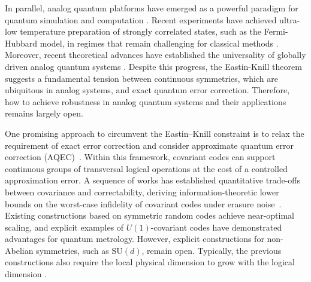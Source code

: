 \documentclass[twocolumn,superscriptaddress,aps,showpacs,amsmath,amstex,amssymb,citeautoscript,floatfix,pra,preprintnumbers]{revtex4-2}
\theoremstyle{plain}
\theoremstyle{plain}
\theoremstyle{plain}
\theoremstyle{plain}
\theoremstyle{plain}
\theoremstyle{plain}
\begin{document}
In parallel, analog quantum platforms have emerged as a powerful paradigm for quantum simulation and computation \cite{Bloch2012,Browaeys2020,Daley2022,Schaefer2020}. 
Recent experiments have achieved ultra-low temperature preparation of strongly correlated states, such as the Fermi-Hubbard model, in regimes that remain challenging for classical methods \cite{Xu2025,Mazurenko2017,Shao2024,Chalopin2024}. 
Moreover, recent theoretical advances have established the universality of globally driven analog quantum systems \cite{Hu2025}. 
Despite this progress, the Eastin-Knill theorem suggests a fundamental tension between continuous symmetries, which are ubiquitous in analog systems, and exact quantum error correction. Therefore, how to achieve robustness in analog quantum systems and their applications remains largely open.

One promising approach to circumvent the Eastin--Knill constraint is to relax the requirement of exact error correction and consider approximate quantum error correction (AQEC)~\cite{Beny2010}. 
Within this framework, covariant codes can support continuous groups of transversal logical operations at the cost of a controlled approximation error. 
A sequence of works has established quantitative trade-offs between covariance and correctability, deriving information-theoretic lower bounds on the worst-case infidelity of covariant codes under erasure noise~\cite{Faist2020,Zhou2021,Faist2023,Kong2022,Yang2022}. 
Existing constructions based on symmetric random codes achieve near-optimal scaling, and explicit examples of $U(1)$-covariant codes have demonstrated advantages for quantum metrology. 
However, explicit constructions for non-Abelian symmetries, such as $\mathrm{SU}(d)$, remain open. Typically, the previous constructions also require the local physical dimension to grow with the logical dimension .
\end{document}
